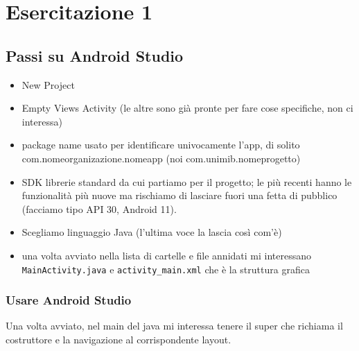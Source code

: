 
\chapter{Esercitazione 1}
\section{Passi su Android Studio}
\begin{itemize}
    \item New Project
    \item Empty Views Activity (le altre sono già pronte per fare cose specifiche, non ci interessa)
    \item package name usato per identificare univocamente l'app, di solito\\
    com.nomeorganizazione.nomeapp (noi com.unimib.nomeprogetto)
    \item SDK librerie standard da cui partiamo per il progetto; le più recenti hanno le funzionalità più nuove ma rischiamo di lasciare fuori una fetta di pubblico (facciamo tipo API 30, Android 11).
    \item Scegliamo linguaggio Java (l'ultima voce la lascia così com'è)
    \item una volta avviato nella lista di cartelle e file annidati mi interessano \texttt{MainActivity.java} e \texttt{activity\_main.xml} che è la struttura grafica
\end{itemize}

\subsection{Usare Android Studio}
\par Una volta avviato, nel main del java mi interessa tenere il super che richiama il costruttore e la navigazione al corrispondente layout.

